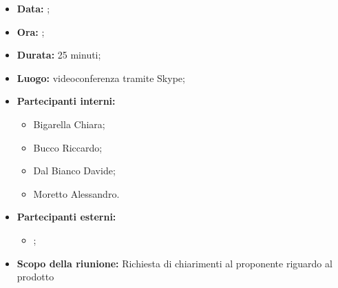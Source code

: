 
	\begin{itemize}
		\item \textbf{Data:} ;
		\item \textbf{Ora:} ;
		\item \textbf{Durata:} 25 minuti;
		\item \textbf{Luogo:} videoconferenza tramite Skype;
		\item \textbf{Partecipanti interni:}
			\begin{itemize}
				\item Bigarella Chiara;
				\item Bucco Riccardo;
				\item Dal Bianco Davide;
				\item Moretto Alessandro.
			\end{itemize}
		\item \textbf{Partecipanti esterni:}
		\begin{itemize}
			\item \proponente;
		\end{itemize}
		\item \textbf{Scopo della riunione:} Richiesta di chiarimenti al proponente riguardo al prodotto
	\end{itemize}
\newpage
